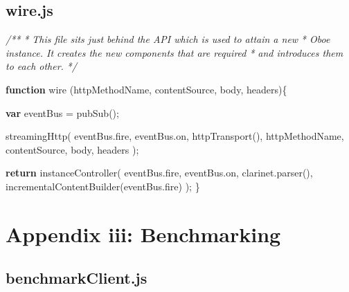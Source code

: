 \documentclass[]{article}
\let\stdsection\section
\renewcommand\section{\newpage\stdsection}
\newenvironment{Shaded}{}{}
\newcommand{\KeywordTok}[1]{\textcolor[rgb]{0.00,0.44,0.13}{\textbf{{#1}}}}
\newcommand{\CommentTok}[1]{\textcolor[rgb]{0.38,0.63,0.69}{\textit{{#1}}}}
\newcommand{\OtherTok}[1]{\textcolor[rgb]{0.00,0.44,0.13}{{#1}}}
\newcommand{\FunctionTok}[1]{\textcolor[rgb]{0.02,0.16,0.49}{{#1}}}
\newcommand{\NormalTok}[1]{{#1}}
\begin{document}
\pagebreak

\subsection{wire.js}

\begin{Shaded}
\begin{Highlighting}[]
\CommentTok{/**}
\CommentTok{ * This file sits just behind the API which is used to attain a new}
\CommentTok{ * Oboe instance. It creates the new components that are required}
\CommentTok{ * and introduces them to each other.}
\CommentTok{ */}

\KeywordTok{function} \FunctionTok{wire} \NormalTok{(httpMethodName, contentSource, body, headers)\{}

   \KeywordTok{var} \NormalTok{eventBus = }\FunctionTok{pubSub}\NormalTok{();}
               
   \FunctionTok{streamingHttp}\NormalTok{( }\OtherTok{eventBus}\NormalTok{.}\FunctionTok{fire}\NormalTok{, }\OtherTok{eventBus}\NormalTok{.}\FunctionTok{on}\NormalTok{,}
                  \FunctionTok{httpTransport}\NormalTok{(), }
                  \NormalTok{httpMethodName, contentSource, body, headers );                              }
     
   \KeywordTok{return} \FunctionTok{instanceController}\NormalTok{( }
               \OtherTok{eventBus}\NormalTok{.}\FunctionTok{fire}\NormalTok{, }\OtherTok{eventBus}\NormalTok{.}\FunctionTok{on}\NormalTok{, }
               \OtherTok{clarinet}\NormalTok{.}\FunctionTok{parser}\NormalTok{(), }
               \FunctionTok{incrementalContentBuilder}\NormalTok{(}\OtherTok{eventBus}\NormalTok{.}\FunctionTok{fire}\NormalTok{) }
   \NormalTok{);}
\NormalTok{\}}
\end{Highlighting}
\end{Shaded}

\section{Appendix iii: Benchmarking}

\subsection{benchmarkClient.js}
\end{document}

